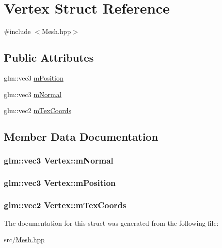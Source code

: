 \hypertarget{structVertex}{}\section{Vertex Struct Reference}
\label{structVertex}


{\ttfamily \#include $<$Mesh.\+hpp$>$}

\subsection*{Public Attributes}
\begin{DoxyCompactItemize}
\item 
glm\+::vec3 \hyperlink{structVertex_a1b8266b61e52e83271623e40b9bbba07}{m\+Position}
\item 
glm\+::vec3 \hyperlink{structVertex_a1954547988e2fed7e7e936eb74e09cae}{m\+Normal}
\item 
glm\+::vec2 \hyperlink{structVertex_a2cff7003a258a96a3a26314024655790}{m\+Tex\+Coords}
\end{DoxyCompactItemize}


\subsection{Member Data Documentation}
\subsubsection[{\texorpdfstring{m\+Normal}{mNormal}}]{\setlength{\rightskip}{0pt plus 5cm}glm\+::vec3 Vertex\+::m\+Normal}\hypertarget{structVertex_a1954547988e2fed7e7e936eb74e09cae}{}\label{structVertex_a1954547988e2fed7e7e936eb74e09cae}
\subsubsection[{\texorpdfstring{m\+Position}{mPosition}}]{\setlength{\rightskip}{0pt plus 5cm}glm\+::vec3 Vertex\+::m\+Position}\hypertarget{structVertex_a1b8266b61e52e83271623e40b9bbba07}{}\label{structVertex_a1b8266b61e52e83271623e40b9bbba07}
\subsubsection[{\texorpdfstring{m\+Tex\+Coords}{mTexCoords}}]{\setlength{\rightskip}{0pt plus 5cm}glm\+::vec2 Vertex\+::m\+Tex\+Coords}\hypertarget{structVertex_a2cff7003a258a96a3a26314024655790}{}\label{structVertex_a2cff7003a258a96a3a26314024655790}


The documentation for this struct was generated from the following file\+:\begin{DoxyCompactItemize}
\item 
src/\hyperlink{Mesh_8hpp}{Mesh.\+hpp}\end{DoxyCompactItemize}
